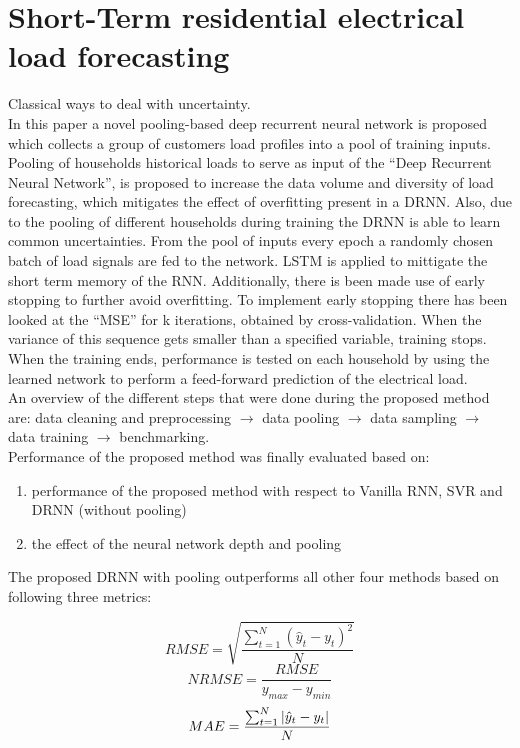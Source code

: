 \section{Short-Term residential electrical load forecasting}
Classical ways to deal with uncertainty.\\


In this paper \cite{Shi2018} a novel pooling-based deep recurrent neural network is proposed which collects a group of customers load profiles into a pool of training inputs. Pooling of households historical loads to serve as input of the ``Deep Recurrent Neural Network'', is proposed to increase the data volume and diversity of load forecasting, which mitigates the effect of overfitting present in a DRNN. Also, due to the pooling of different households during training the DRNN is able to learn common uncertainties. From the pool of inputs every epoch a randomly chosen batch of load signals are fed to the network. LSTM is applied to mittigate the short term memory of the RNN. Additionally, there is been made use of early stopping to further avoid overfitting. To implement early stopping there has been looked at the ``MSE'' for k iterations, obtained by cross-validation. When the variance of this sequence gets smaller than a specified variable, training stops. When the training ends, performance is tested on each household by using the learned network to perform a feed-forward prediction of the electrical load.\\

An overview of the different steps that were done during the proposed method are: data cleaning and preprocessing $\rightarrow$ data pooling $\rightarrow$ data sampling $\rightarrow$ data training $\rightarrow$ benchmarking.\\

Performance of the proposed method was finally evaluated based on: 
\begin{enumerate}
	\item performance of the proposed method with respect to Vanilla RNN, SVR and DRNN (without pooling)
	\item the effect of the neural network depth and pooling
\end{enumerate}

The proposed DRNN with pooling outperforms all other four methods based on following three metrics:

\begin{equation}
	RMSE = \sqrt{\frac{\sum_{t=1}^{N}(\hat{y}_t-y_t)^2}{N}}
\end{equation}
\begin{equation}
	NRMSE = \frac{RMSE}{y_{max}-y_{min}}
\end{equation}
\begin{equation}
	MAE = \frac{\sum_{t=1}^{N}\abs{\hat{y}_t-y_t}}{N}
\end{equation}

